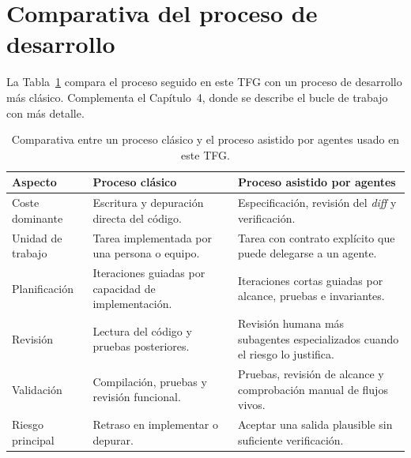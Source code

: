 \clearpage

\section{Comparativa del proceso de desarrollo}

La Tabla~\ref{tab:comparativa-desarrollo-ia} compara el proceso seguido en este
TFG con un proceso de desarrollo más clásico. Complementa el Capítulo~4, donde
se describe el bucle de trabajo con más detalle.

\begin{table}[H]
\begin{center}
\small
\setlength{\tabcolsep}{4pt}
\renewcommand{\arraystretch}{1.18}
\begin{tabular}{|>{\raggedright\arraybackslash}p{3.0cm}|>{\raggedright\arraybackslash}p{4.4cm}|>{\raggedright\arraybackslash}p{4.4cm}|} \hline
\textbf{Aspecto} & \textbf{Proceso clásico} & \textbf{Proceso asistido por agentes} \\ \hline
Coste dominante & Escritura y depuración directa del código. & Especificación, revisión del \textit{diff} y verificación. \\ \hline
Unidad de trabajo & Tarea implementada por una persona o equipo. & Tarea con contrato explícito que puede delegarse a un agente. \\ \hline
Planificación & Iteraciones guiadas por capacidad de implementación. & Iteraciones cortas guiadas por alcance, pruebas e invariantes. \\ \hline
Revisión & Lectura del código y pruebas posteriores. & Revisión humana más subagentes especializados cuando el riesgo lo justifica. \\ \hline
Validación & Compilación, pruebas y revisión funcional. & Pruebas, revisión de alcance y comprobación manual de flujos vivos. \\ \hline
Riesgo principal & Retraso en implementar o depurar. & Aceptar una salida plausible sin suficiente verificación. \\ \hline
\end{tabular}
\caption[Comparativa del proceso de desarrollo]{Comparativa entre un proceso
clásico y el proceso asistido por agentes usado en este TFG.}
\label{tab:comparativa-desarrollo-ia}
\end{center}
\end{table}

